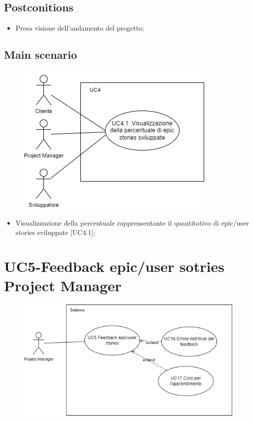 \documentclass{article}
\begin{document}
    \subsection*{Postconitions}
        \begin{itemize}
            \item Presa visione dell'andamento del progetto;
        \end{itemize}
        
    \subsection*{Main scenario}
        \begin{figure}[h]
          \centering
          \includegraphics{./imgUML/UC4-zoom.png}
          \label{fig:immagine}
        \end{figure}
        
        \begin{itemize}
            \item Visualizzazione della percentuale rapprensentante il quantitativo di epic/user stories sviluppate [UC4.1];
        \end{itemize}
        

\section{UC5-Feedback epic/user sotries Project Manager}
    \begin{figure}[h]
      \centering
      \includegraphics{./imgUML/UC5.png}
      \label{fig:immagine}
    \end{figure}
\end{document}
